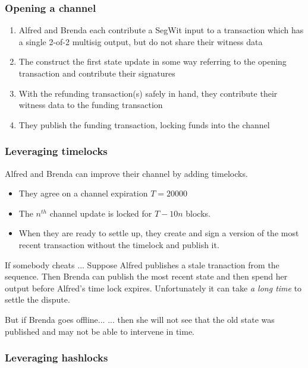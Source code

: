 \documentclass{beamer}
\begin{document}
\begin{frame}
	\frametitle{Opening a channel}
	\begin{enumerate}
		\item Alfred and Brenda each contribute a SegWit input to a transaction 
			which has a single 2-of-2 multisig output, but do not share their witness 
			data \pause
		\item The construct the first state update in some way referring to the 
			opening transaction and contribute their signatures \pause
		\item With the refunding transaction(s) safely in hand, they contribute 
			their witness data to the funding transaction  \pause
		\item They publish the funding transaction, locking funds into the channel
	\end{enumerate}
\end{frame}
\begin{frame}
	\frametitle{Leveraging timelocks}
	Alfred and Brenda can improve their channel by adding timelocks.
	\pause
	\begin{itemize}
		\item They agree on a channel expiration $ T = 20000 $ \pause
		\item The $ n^{th} $ channel update is locked for $ T - 10 n $ blocks. \pause
		\item When they are ready to settle up, they create and sign a version of 
			the most recent transaction without the timelock and publish it. \pause
	\end{itemize}
	\begin{block}{If somebody cheats ...}
		Suppose Alfred publishes a stale tranaction from the sequence.  Then Brenda 
		can publish the most recent state and then spend her output before Alfred's 
		time lock expires.  Unfortunately it can take \emph{a long time} to settle 
		the dispute.
	\end{block}
	\pause
	\begin{block}{But if Brenda goes offline...}
		... then she will not see that the old state was published and may not be 
		able to intervene in time.
	\end{block}
\end{frame}
\begin{frame}
	\frametitle{Leveraging hashlocks}
\end{frame}
\end{document}
